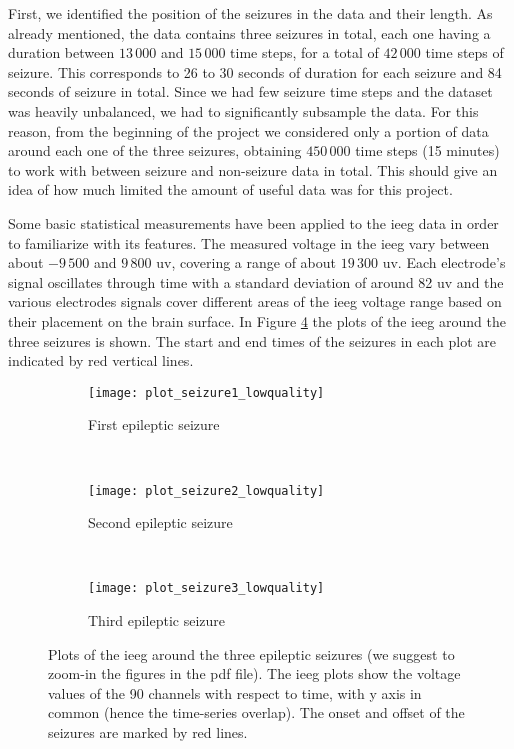 First, we identified the position of the seizures in the data and their length. As already mentioned, the data contains three seizures in total, each one having a duration between $13\,000$ and $15\,000$ time steps, for a total of $42\,000$ time steps of seizure. This corresponds to 26 to 30 seconds of duration for each seizure and 84 seconds of seizure in total. Since we had few seizure time steps and the dataset was heavily unbalanced, we had to significantly subsample the data. For this reason, from the beginning of the project we considered only a portion of data around each one of the three seizures, obtaining $450\,000$ time steps (15 minutes) to work with between seizure and non-seizure data in total. This should give an idea of how much limited the amount of useful data was for this project.

Some basic statistical measurements have been applied to the \acs{ieeg} data in order to familiarize with its features. The measured voltage in the \acs{ieeg} vary between about $-9\,500$ and $9\,800$ \acs{uv}, covering a range of about $19\,300$ \acs{uv}. Each electrode's signal oscillates through time with a standard deviation of around 82 \acs{uv} and the various electrodes signals cover different areas of the \acs{ieeg} voltage range based on their placement on the brain surface. In Figure \ref{fig:plot_seizures} the plots of the \acs{ieeg} around the three seizures is shown. The start and end times of the seizures in each plot are indicated by red vertical lines.
\newpage
\begin{figure}[H]
    \centering
    \begin{subfigure}[t]{0.7\textwidth}
		\texttt{[image: plot\_seizure1\_lowquality]}
        \caption{First epileptic seizure}
        \label{fig:plot_seizure1}
	\end{subfigure}
	~
	\begin{subfigure}[t]{0.7\textwidth}
		\texttt{[image: plot\_seizure2\_lowquality]}
        \caption{Second epileptic seizure}
        \label{fig:plot_seizure2}
    \end{subfigure}
    ~
    \begin{subfigure}[t]{0.7\textwidth}
		\texttt{[image: plot\_seizure3\_lowquality]}
        \caption{Third epileptic seizure}
        \label{fig:plot_seizure3}
	\end{subfigure}
    \caption{Plots of the \acs{ieeg} around the three epileptic seizures (we suggest to zoom-in the figures in the pdf file). The \acs{ieeg} plots show the voltage values of the 90 channels with respect to time, with y axis in common (hence the time-series overlap). The onset and offset of the seizures are marked by red lines.}
    \label{fig:plot_seizures}
\end{figure}
